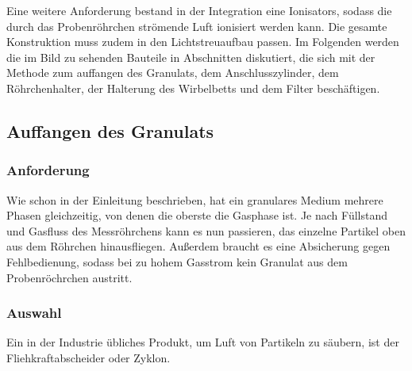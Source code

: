 Eine weitere Anforderung bestand in der Integration eine Ionisators, sodass die durch das Probenröhrchen strömende Luft ionisiert werden kann. Die gesamte Konstruktion muss zudem in den Lichtstreuaufbau passen. Im Folgenden werden die im Bild zu sehenden Bauteile in Abschnitten diskutiert, die sich mit der Methode zum auffangen des Granulats, dem Anschlusszylinder, dem Röhrchenhalter, der Halterung des Wirbelbetts und dem Filter beschäftigen.


\subsection{Auffangen des Granulats}

\subsubsection{Anforderung}

Wie schon in der Einleitung beschrieben, hat ein granulares Medium mehrere Phasen gleichzeitig, von denen die oberste die Gasphase ist. Je nach Füllstand und Gasfluss des Messröhrchens kann es nun passieren, das einzelne Partikel oben aus dem Röhrchen hinausfliegen. Außerdem braucht es eine Absicherung gegen Fehlbedienung, sodass bei zu hohem Gasstrom kein Granulat aus dem Probenröchrchen austritt.

\subsubsection{Auswahl}

Ein in der Industrie übliches Produkt, um Luft von Partikeln zu säubern, ist der Fliehkraftabscheider oder Zyklon. 


